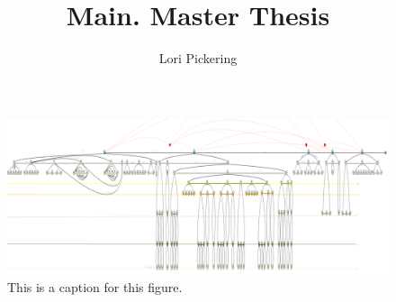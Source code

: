 \documentclass[hidelinks,12pt,a4paper]{report}
\begin{document}
\lstset{language=ML, basicstyle=\scriptsize}
\title{Main. Master Thesis}
\author{Lori Pickering}

\begin{figure}[t]
\includegraphics[width=\textwidth]{../figures/overalldiagramsquashed.png}
\caption{This is a caption for this figure.}
\end{figure}

\begin{doublespace}
\cleardoublepage {}
{}

\setcounter{page}{1}
\end{doublespace}
\cleardoublepage {}

\tableofcontents
\cleardoublepage



\hypersetup{
  colorlinks   = true, %
  urlcolor     = blue, %
  linkcolor    = blue, %
  citecolor   = red %
}

\cleardoublepage {}
\listoffigures

\cleardoublepage {}
\listoftables

\cleardoublepage
{}
%
\printnoidxglossary[type=\acronymtype, title={List of Acronyms}]
\cleardoublepage

\parskip=18pt
\raggedright

\begin{doublespace}

\cleardoublepage


\cleardoublepage


\cleardoublepage


\cleardoublepage


\cleardoublepage


\cleardoublepage


\cleardoublepage


\cleardoublepage


\cleardoublepage
\end{doublespace}
\cleardoublepage
\end{document}
